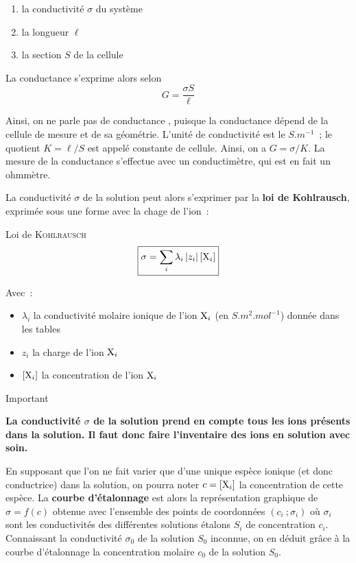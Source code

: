 \documentclass[a4paper, 11pt, final, garamond]{book}
\begin{document}
\begin{enumerate}
    \item la conductivité $\sigma$ du système
    \item la longueur $\ell$
    \item la section $S$ de la cellule
\end{enumerate}

La conductance s'exprime alors selon
\[G = \frac{\sigma S}{\ell}\]

Ainsi, on ne parle pas de conductance , puisque la
conductance dépend de la cellule de mesure et de sa géométrie. L'unité de
conductivité est le $\si{S.m^{-1}}$~; le quotient $K = \ell / S$ est appelé
constante de cellule. Ainsi, on a $G = \sigma / K$. La mesure de la conductance
s'effectue avec un conductimètre, qui est en fait un ohmmètre.\bigbreak

La conductivité $\sigma$ de la solution peut alors s'exprimer par la \textbf{loi
de Kohlrausch}, exprimée sous une forme avec la chage de l'ion~:
\begin{rprop}{Loi de \textsc{Kohlrausch}}
    \[\boxed{\sigma = \sum_{i} \lambda_i \left|z_i\right| [{\rm X}_i]}\]

    Avec~:
    \begin{itemize}
        \item $\lambda_i$ la conductivité molaire ionique de l'ion ${\rm X}_i$ (en
            $\si{S.m^2.mol^{-1}}$) donnée dans les tables
        \item $z_i$ la charge de l'ion ${\rm X}_i$
        \item $[{\rm X}_i]$ la concentration de l'ion ${\rm X}_i$
    \end{itemize}
\end{rprop}

\begin{rror}{Important}
    \begin{center}
        \bfseries
        La conductivité $\sigma$ de la solution prend en compte tous les ions
        présents dans la solution. Il faut donc faire l'inventaire des ions en
        solution avec soin.
    \end{center}
\end{rror}

En supposant que l'on ne fait varier que d'une unique espèce ionique (et donc
conductrice) dans la solution, on pourra noter $c = [{\rm X}_i]$ la
concentration de cette espèce. La \textbf{courbe d'étalonnage} est alors la
représentation graphique de $\sigma = f(c)$ obtenue avec l'ensemble des points
de coordonnées $(c_i~; \sigma_i)$ où $\sigma_i$ sont les conductivités des
différentes solutions étalons $S_i$ de concentration $c_i$. Connaissant la
conductivité $\sigma_0$ de la solution $S_0$ inconnue, on en déduit grâce à la
courbe d'étalonnage la concentration molaire $c_0$ de la solution $S_0$.
\end{document}
